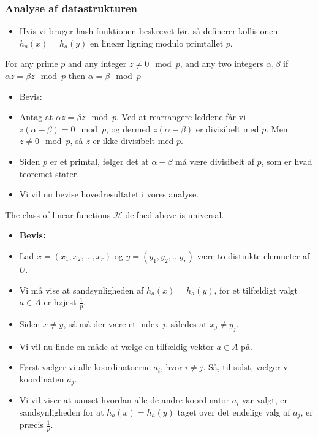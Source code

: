 \documentclass{beamer}
\begin{document}
\begin{frame}[allowframebreaks]
  \frametitle{Analyse af datastrukturen}
 \begin{itemize}
 \item Hvis vi bruger hash funktionen beskrevet før, så definerer kollisionen $h_{a}(x) = h_{a}(y)$ en lineær ligning modulo primtallet $p$. 
 \end{itemize} 
 \begin{theorem}[13.24]
For any prime $p$ and any integer $z \neq 0 \mod p$, and any two integers $\alpha, \beta$ if $\alpha z = \beta z \mod p$ then $\alpha = \beta \mod p$
\end{theorem}
\begin{itemize}
\item Bevis:
\item Antag at $\alpha z = \beta z \mod p$. Ved at rearrangere leddene får vi $z(\alpha-\beta) = 0 \mod p$, og dermed $z(\alpha - \beta )$ er divisibelt med $p$. Men $z \neq 0 \mod p$, så $z$ er ikke divisibelt med $p$. 
\item Siden $p$ er et primtal, følger det at $\alpha - \beta $ må være divisibelt af $p$, som er hvad teoremet stater.
\item Vi vil nu bevise hovedresultatet i vores analyse.
  \end{itemize}
\begin{theorem}[13.25]
The class of linear functions $\mathcal{H}$ deifned above is universal.
\end{theorem}
  \begin{itemize}
\item \textbf{Bevis:}
\item Lad $x = (x_{1}, x_{2}, \ldots, x_{r})$ og $y = (y_{1}, y_{2}, \ldots y_{r})$ være to distinkte elemneter af $U$. 
\item Vi må vise at sandsynligheden af $h_{a}(x) = h_{a}(y)$, for et tilfældigt valgt $a \in A$ er højest $\frac{1}{p}$.
\item Siden $x \neq y$, så må der være et index $j$, således at $x_{j} \neq y_{j}$. 
\item Vi vil nu finde en måde at vælge en tilfældig vektor $a \in A$ på. 
\item Først vælger vi alle koordinatoerne $a_{i}$, hvor $i \neq j$. Så, til sidst, vælger vi koordinaten $a_{j}$. 
\item Vi vil viser at uanset hvordan alle de andre koordinator $a_{i}$ var valgt, er sandsynligheden for at $h_{a}(x) = h_{a}(y)$ taget over det endelige valg af $a_{j}$, er præcis $\frac{1}{p}$. 

\end{itemize}
\end{frame}
\end{document}
